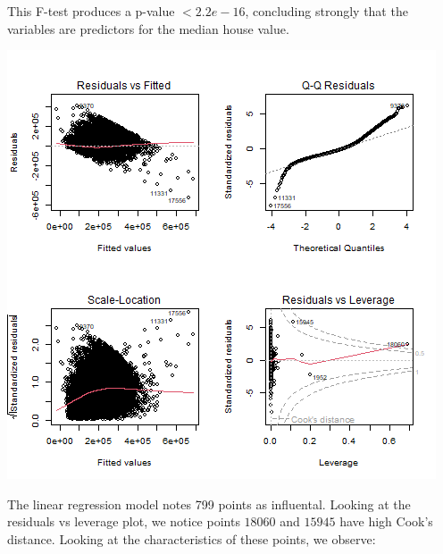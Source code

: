 \documentclass[10pt]{article}
\begin{document}
\hspace*{2em} This F-test produces a p-value $< 2.2e-16$, concluding strongly that the variables are predictors for the median house value.\\
\begin{center}
    \includegraphics[scale=0.75]{residual}
\end{center}
\hspace*{2em} The linear regression model notes 799 points as influental. Looking at the residuals vs leverage plot, we notice points $18060$ and 
$15945$ have high Cook's distance. Looking at the characteristics of these points, we observe:\\
\end{document}
